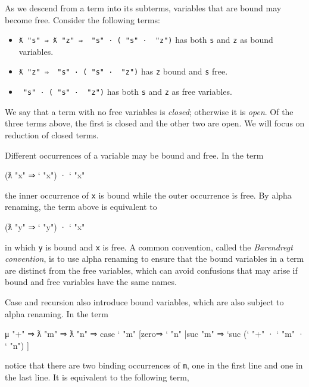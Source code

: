 As we descend from a term into its subterms, variables that are bound
may become free. Consider the following terms:

\begin{itemize}
\item
  \texttt{ƛ\ "s"\ ⇒\ ƛ\ "z"\ ⇒\ \textasciigrave{}\ "s"\ ·\ (\textasciigrave{}\ "s"\ ·\ \textasciigrave{}\ "z")}
  has both \texttt{s} and \texttt{z} as bound variables.
\item
  \texttt{ƛ\ "z"\ ⇒\ \textasciigrave{}\ "s"\ ·\ (\textasciigrave{}\ "s"\ ·\ \textasciigrave{}\ "z")}
  has \texttt{z} bound and \texttt{s} free.
\item
  \texttt{\textasciigrave{}\ "s"\ ·\ (\textasciigrave{}\ "s"\ ·\ \textasciigrave{}\ "z")}
  has both \texttt{s} and \texttt{z} as free variables.
\end{itemize}

We say that a term with no free variables is \emph{closed}; otherwise it
is \emph{open}. Of the three terms above, the first is closed and the
other two are open. We will focus on reduction of closed terms.

Different occurrences of a variable may be bound and free. In the term

\begin{myDisplay}
(ƛ "x" ⇒ ` "x") · ` "x"
\end{myDisplay}

the inner occurrence of \texttt{x} is bound while the outer occurrence
is free. By alpha renaming, the term above is equivalent to

\begin{myDisplay}
(ƛ "y" ⇒ ` "y") · ` "x"
\end{myDisplay}

in which \texttt{y} is bound and \texttt{x} is free. A common
convention, called the \emph{Barendregt convention}, is to use alpha
renaming to ensure that the bound variables in a term are distinct from
the free variables, which can avoid confusions that may arise if bound
and free variables have the same names.

Case and recursion also introduce bound variables, which are also
subject to alpha renaming. In the term

\begin{myDisplay}
μ "+" ⇒ ƛ "m" ⇒ ƛ "n" ⇒
  case ` "m"
    [zero⇒ ` "n"
    |suc "m" ⇒ `suc (` "+" · ` "m" · ` "n") ]
\end{myDisplay}

notice that there are two binding occurrences of \texttt{m}, one in the
first line and one in the last line. It is equivalent to the following
term,

